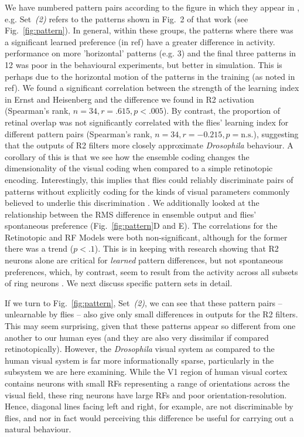 We have numbered pattern pairs according to the figure in which they appear in \cite{Ernst1999}, e.g. Set~\emph{(2)} refers to the patterns shown in Fig.~2 of that work (see Fig.~\ref{fig:pattern}). In general, within these groups, the patterns where there was a significant learned preference (in ref) have a greater difference in activity. performance on more 'horizontal' patterns (e.g. 3) and the final three patterns in 12 was poor in the behavioural experiments, but better in simulation. This is perhaps due to the horizontal motion of the patterns in the training (as noted in ref).
We found a significant correlation between the strength of the learning index in Ernst and Heisenberg \cite{Ernst1999} and the difference we found in R2 activation (Spearman's rank, $n=34, r=.615, p<.005$).
By contrast, the proportion of retinal overlap was not significantly correlated with the flies' learning index for different pattern pairs (Spearman's rank, $n=34, r= -0.215, p=\mathrm{n.s.}$), suggesting that the outputs of R2 filters more closely approximate \emph{Drosophila} behaviour. A corollary of this is that we see how the ensemble coding changes the dimensionality of the visual coding when compared to a simple retinotopic encoding.
Interestingly, this implies that flies could reliably discriminate pairs of patterns without explicitly coding for the kinds of visual parameters commonly believed to underlie this discrimination \cite{Pan2009,Liu2006,Ernst1999}.
We additionally looked at the relationship between the RMS difference in ensemble output and flies' spontaneous preference (Fig.~\ref{fig:pattern}D and E).
The correlations for the Retinotopic and RF Models were both non-significant, although for the former there was a trend ($p<.1$).
This is in keeping with research showing that R2 neurons alone are critical for \emph{learned} pattern differences, but not spontaneous preferences, which, by contrast, seem to result from the activity across all subsets of ring neurons \texthl{[cit]}.
We next discuss specific pattern sets in detail.


If we turn to Fig.~\ref{fig:pattern}, Set~\emph{(2)}, we can see that these pattern pairs -- unlearnable by flies -- also give only small differences in outputs for the R2 filters.
This may seem surprising, given that these patterns appear so different from one another to our human eyes (and they are also very dissimilar if compared retinotopically).
However, the \emph{Drosophila} visual system as compared to the human visual system is far more informationally sparse, particularly in the subsystem we are here examining.
While the V1 region of human visual cortex contains neurons with small RFs representing a range of orientations across the visual field, these ring neurons have large RFs and poor orientation-resolution.
Hence, diagonal lines facing left and right, for example, are not discriminable by flies, and nor in fact would perceiving this difference be useful for carrying out a natural behaviour.

